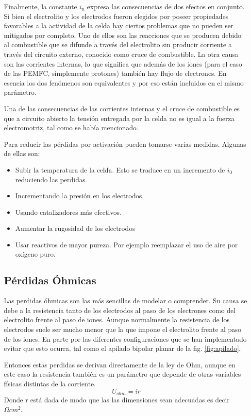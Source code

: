 Finalmente, la constante $i_{n}$ expresa las consecuencias de dos efectos en conjunto. Si bien el electrolito y los electrodos
fueron elegidos por poseer propiedades favorables a la actividad de la celda hay ciertos problemas que no pueden ser mitigados
por completo. Uno de ellos son las reacciones que se producen debido al combustible que se difunde a través del electrolito
sin producir corriente a través del circuito externo, conocido como cruce de combustible. La otra causa son las corrientes
internas, lo que significa que además de los iones (para el caso de las PEMFC, simplemente protones) también hay flujo de electrones. 
En esencia los dos fenómenos son equivalentes y por eso están incluidos en el mismo parámetro.

Una de las consecuencias de las corrientes internas y el cruce de combustible es que a circuito abierto la tensión entregada
por la celda no es igual a la fuerza electromotriz, tal como se había mencionado.

Para reducir las pérdidas por activación pueden tomarse varias medidas. Algunas de ellas son:
\begin{itemize}
 \item Subir la temperatura de la celda. Esto se traduce en un incremento de $i_{0}$ reduciendo las perdidas.
 \item Incrementando la presión en los electrodos.
 \item Usando catalizadores más efectivos.
 \item Aumentar la rugosidad de los electrodos
 \item Usar reactivos de mayor pureza. Por ejemplo reemplazar el uso de aire por oxígeno puro.
\end{itemize}


\subsection{Pérdidas Óhmicas}
Las perdidas óhmicas son las más sencillas de modelar o comprender. Su causa se debe a la resistencia tanto de los electrodos
al paso de los electrones como del electrolito frente al paso de iones. Aunque normalmente la resistencia de los electrodos
suele ser mucho menor que la que impone el electrolito frente al paso de los iones. En parte por las diferentes configuraciones
que se han implementado evitar que esto ocurra, tal como el apilado bipolar planar de la fig. \ref{fig:apilado}.

Entonces estas perdidas se derivan directamente de la ley de Ohm, aunque en este caso la resistencia también es un parámetro
que depende de otras variables físicas distintas de la corriente.
$$ U_{ohm}=ir $$
Donde r está dada de modo que las las dimensiones sean adecuadas es decir $\Omega cm^2 $.

